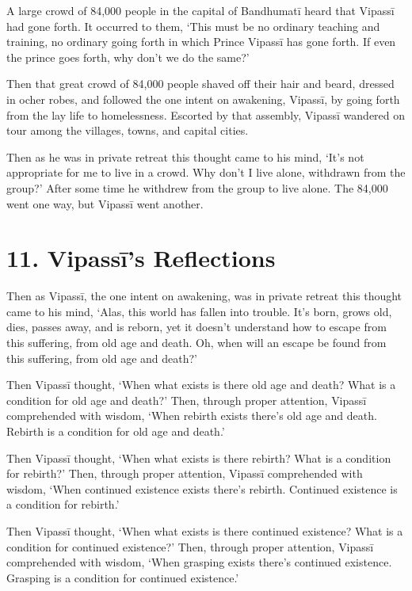 \documentclass[12pt,openany]{book}%
\begin{document}
A large crowd of 84,000 people in the capital of \textsanskrit{Bandhumatī} heard that \textsanskrit{Vipassī} had gone forth. It occurred to them, ‘This must be no ordinary teaching and training, no ordinary going forth in which Prince \textsanskrit{Vipassī} has gone forth. If even the prince goes forth, why don’t we do the same?’ 

Then that great crowd of 84,000 people shaved off their hair and beard, dressed in ocher robes, and followed the one intent on awakening, \textsanskrit{Vipassī}, by going forth from the lay life to homelessness. Escorted by that assembly, \textsanskrit{Vipassī} wandered on tour among the villages, towns, and capital cities. 

Then as he was in private retreat this thought came to his mind, ‘It’s not appropriate for me to live in a crowd. Why don’t I live alone, withdrawn from the group?’ After some time he withdrew from the group to live alone. The 84,000 went one way, but \textsanskrit{Vipassī} went another. 

\section*{11. \textsanskrit{Vipassī}’s Reflections }

Then as \textsanskrit{Vipassī}, the one intent on awakening, was in private retreat this thought came to his mind, ‘Alas, this world has fallen into trouble. It’s born, grows old, dies, passes away, and is reborn, yet it doesn’t understand how to escape from this suffering, from old age and death. Oh, when will an escape be found from this suffering, from old age and death?’ 

Then \textsanskrit{Vipassī} thought, ‘When what exists is there old age and death? What is a condition for old age and death?’ Then, through proper attention, \textsanskrit{Vipassī} comprehended with wisdom, ‘When rebirth exists there’s old age and death. Rebirth is a condition for old age and death.’ 

Then \textsanskrit{Vipassī} thought, ‘When what exists is there rebirth? What is a condition for rebirth?’ Then, through proper attention, \textsanskrit{Vipassī} comprehended with wisdom, ‘When continued existence exists there’s rebirth. Continued existence is a condition for rebirth.’ 

Then \textsanskrit{Vipassī} thought, ‘When what exists is there continued existence? What is a condition for continued existence?’ Then, through proper attention, \textsanskrit{Vipassī} comprehended with wisdom, ‘When grasping exists there’s continued existence. Grasping is a condition for continued existence.’ 
\end{document}
